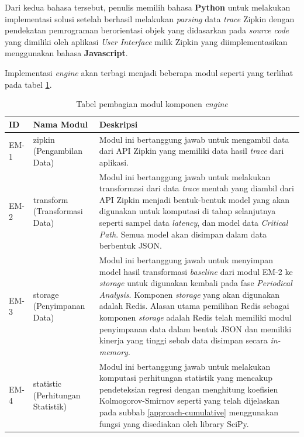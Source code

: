 Dari kedua bahasa tersebut, penulis memilih bahasa \textbf{Python} untuk melakukan implementasi solusi setelah berhasil melakukan \textit{parsing} data \textit{trace} Zipkin dengan pendekatan pemrograman berorientasi objek yang didasarkan pada \textit{source code} yang dimiliki oleh aplikasi \textit{User Interface} milik Zipkin yang diimplementasikan menggunakan bahasa \textbf{Javascript}. 

Implementasi \textit{engine} akan terbagi menjadi beberapa modul seperti yang terlihat pada tabel \ref{engine-module}.

\begin{small}
	\begin{longtable}{ | p{1cm} | p{3cm} | p{10cm} | }
		\caption{Tabel pembagian modul komponen \textit{engine}}
		\label{engine-module}                                                           
		\\ \hline
		\centering\bfseries{ID} & \centering\bfseries{Nama Modul} & \centering\bfseries{Deskripsi} \tabularnewline \hline
		\endfirsthead
		EM-1 & zipkin (Pengambilan Data) & Modul ini bertanggung jawab untuk mengambil data dari API Zipkin yang memiliki data hasil \textit{trace} dari aplikasi. \\ \hline
		EM-2 & transform (Transformasi Data) & Modul ini bertanggung jawab untuk melakukan transformasi dari data \textit{trace} mentah yang diambil dari API Zipkin menjadi bentuk-bentuk model yang akan digunakan untuk komputasi di tahap selanjutnya seperti sampel data \textit{latency}, dan model data \textit{Critical Path}. Semua model akan disimpan dalam data berbentuk JSON. \\ \hline
		EM-3 & storage (Penyimpanan Data) & Modul ini bertanggung jawab untuk menyimpan model hasil transformasi \textit{baseline} dari modul EM-2 ke \textit{storage} untuk digunakan kembali pada fase \textit{Periodical Analysis}. Komponen \textit{storage} yang akan digunakan adalah Redis. Alasan utama pemilihan Redis sebagai komponen \textit{storage} adalah Redis telah memiliki modul penyimpanan data dalam bentuk JSON dan memiliki kinerja yang tinggi sebab data disimpan secara \textit{in-memory}. \\ \hline
		EM-4 & statistic (Perhitungan Statistik) & Modul ini bertanggung jawab untuk melakukan komputasi perhitungan statistik yang mencakup pendeteksian regresi dengan menghitung koefisien Kolmogorov-Smirnov seperti yang telah dijelaskan pada subbab \ref{approach-cumulative} menggunakan fungsi yang disediakan oleh library SciPy. \\ \hline

\end{longtable}
\end{small}
